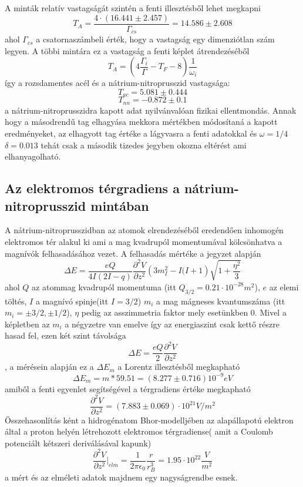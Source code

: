 \documentclass[a4paper,12pt]{article}
\numberwithin{equation}{subsection}
\begin{document}
A minták relatív vastagságát szintén a fenti illesztésből lehet megkapni \[T_A=\frac{4\cdot (16.441\pm2.457)}{\Gamma_{cs}}=14.586\pm2.608\] ahol $\Gamma_{cs}$ a csatornaszámbeli érték, hogy a vastagság egy dimenziótlan szám legyen. A többi mintára ez a vastagság a fenti képlet átrendezéséből \[T_A=\left(4\frac{\Gamma_i}{\Gamma}-T_F-8\right)\frac{1}{\omega_i}\] így a rozsdamentes acél és a nátrium-nitroprusszid vastagsága:
\[T_{ac}=5.081\pm0.444\]
\[T_{nn}=-0.872\pm0.1\] a nátrium-nitroprusszidra kapott adat nyilvánvalóan fizikai ellentmondás.
Annak hogy a másodrendű tag elhagyása mekkora mértékben módosítaná a kapott eredményeket, az elhagyott tag értéke a lágyvasra a fenti adatokkal és $\omega=1/4$ $\delta=0.013$ tehát csak a második tizedes jegyben okozna eltérést ami elhanyagolható.
\subsection{Az elektromos térgradiens a nátrium-nitroprusszid mintában}
A nátrium-nitroprusszidban az atomok elrendezéséből eredendően inhomogén elektromos tér alakul ki ami a mag kvadrupól momentumával kölcsönhatva a magnívók felhasadásához vezet. A felhasadás mértéke a jegyzet alapján \[\Delta E=\frac{eQ}{4I(2I-q)}\frac{\partial^2 V}{\partial z^2}\left(3m^2_I-I(I+1\right)\sqrt{1+\frac{\eta^2}{3}}\] ahol $Q$ az atommag kvadrupól momentuma (itt $Q_{3/2}=0.21\cdot10^{-28}m^2$), $e$ az elemi töltés, $I$ a magnívó spinje(itt $I=3/2$) $m_i$ a mag mágneses kvantumszáma (itt $m_i=\pm3/2, \pm1/2$), $\eta$ pedig az asszimmetria faktor mely esetünkben 0. Mivel a képletben az $m_i$ a négyzetre van emelve így az energiaszint csak kettő részre hasad fel, ezen két szint távolsága
\[\Delta E=\frac{eQ}{2} \frac{\partial^2 V}{\partial z^2}\], a mérésein alapján ez a $\Delta E_m$ a Lorentz illesztésből megkapható
\[\Delta E_m=m*59.51=(8.277\pm0.716)10^{-9}eV\]
amiből a fenti egyenlet segítségével a térgradiens értéke megkapható 
\[\frac{\partial^2 V}{\partial z^2}=(7.883 \pm 0.069)\cdot10^{21} V/m^2\]
Összehasonlítás ként a hidrogénatom Bhor-modelljében az alapállapotú elektron által a proton helyén létrehozott elektromos térgradiense( amit a Coulomb potenciált kétszeri deriválásával kapunk)  \[\frac{\partial^2 V}{\partial z^2} \bigg\vert_{elm}=\frac{1}{2\pi\epsilon_0}\frac{r}{r^3_B}=1.95\cdot10^{22}\frac{V}{m^2}\] a mért és az elméleti adatok majdnem egy nagyságrendbe esnek.
\end{document}
